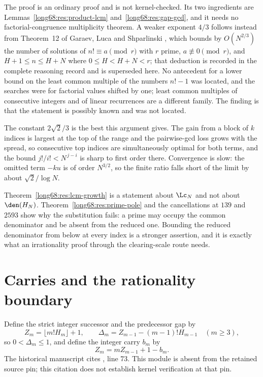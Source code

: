 The proof is an ordinary proof and is not kernel-checked.  Its two
ingredients are Lemmas~\ref{long68:res:product-lcm} and~\ref{long68:res:gap-gcd}, and it
needs no factorial-congruence multiplicity theorem.  A weaker exponent
$4/3$ follows instead from Theorem~12 of Garaev, Luca and Shparlinski
\cite[arXiv v1, Thm.~12, p.~16]{garaev-luca-shparlinski}, which bounds by
$O(N^{2/3})$ the number of solutions of $n!\equiv a\pmod r$ with
$r$ prime, $a\not\equiv0\pmod r$, and $H+1\le n\le H+N$ where
$0\le H<H+N<r$; that deduction is recorded in the complete reasoning record and
is superseded here.  No antecedent for a lower bound on the least common
multiple of the numbers $n!-1$ was located, and the searches were for
factorial values shifted by one; least common multiples of consecutive
integers and of linear recurrences are a different family.  The finding is
that the statement is possibly known and was not located.

The constant $2\sqrt2/3$ is the best this argument gives.  The gain from a
block of $k$ indices is largest at the top of the range and the pairwise-gcd
loss grows with the spread, so consecutive top indices are simultaneously
optimal for both terms, and the bound $j!/i!<N^{\,j-i}$ is sharp to first
order there.  Convergence is slow: the omitted term $-ku$ is of order
$N^{3/2}$, so the finite ratio falls short of the limit by about
$\sqrt2/\log N$.

Theorem~\ref{long68:res:lcm-growth} is a statement about $\Lc_N$ and not about
$\den(H_N)$.  Theorem~\ref{long68:res:prime-pole} and the cancellations at $139$ and
$2593$ show why the substitution fails: a prime may occupy the common
denominator and be absent from the reduced one.  Bounding the reduced
denominator from below at every index is a stronger assertion, and it is
exactly what an irrationality proof through the clearing-scale route needs.

\section{Carries and the rationality boundary}\label{long68:sec:carry}

Define the strict integer successor and the predecessor gap by
\[
 Z_m=\lfloor m!H_m\rfloor+1,\qquad
 \Delta_m=Z_{m-1}-(m-1)!H_{m-1}\quad(m\ge3),
\]
so $0<\Delta_m\le1$, and define the integer carry $b_m$ by
\begin{equation}\label{long68:eq:carry-recurrence}
 Z_m=mZ_{m-1}+1-b_m .
\end{equation}
  The historical manuscript cites , line 73. This module is absent from the retained source pin; this citation does not establish kernel verification at that pin.

